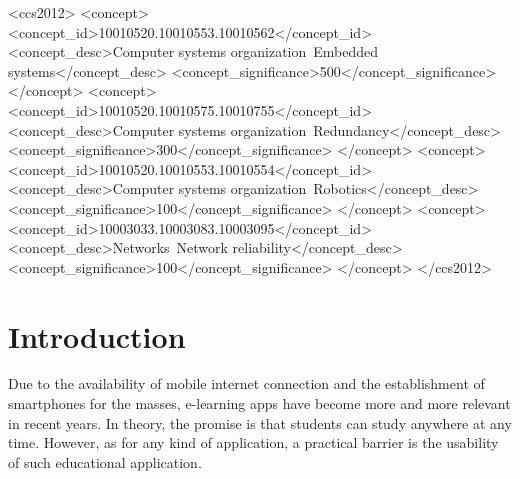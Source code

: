 \documentclass{sig-alternate-05-2015}
\begin{document}
%
%
\begin{CCSXML}
  <ccs2012>
  <concept>
  <concept_id>10010520.10010553.10010562</concept_id>
  <concept_desc>Computer systems organization~Embedded systems</concept_desc>
  <concept_significance>500</concept_significance>
  </concept>
  <concept>
  <concept_id>10010520.10010575.10010755</concept_id>
  <concept_desc>Computer systems organization~Redundancy</concept_desc>
  <concept_significance>300</concept_significance>
  </concept>
  <concept>
  <concept_id>10010520.10010553.10010554</concept_id>
  <concept_desc>Computer systems organization~Robotics</concept_desc>
  <concept_significance>100</concept_significance>
  </concept>
  <concept>
  <concept_id>10003033.10003083.10003095</concept_id>
  <concept_desc>Networks~Network reliability</concept_desc>
  <concept_significance>100</concept_significance>
  </concept>
  </ccs2012>
\end{CCSXML}
%
%
%
%
\printccsdesc
\section{Introduction}
Due to the availability of mobile internet connection and the establishment of
smartphones for the masses, e-learning apps have become more and more relevant
in recent years.  In theory, the promise is that students can study anywhere
at any time. However, as for any kind of application, a practical barrier is
the usability of such educational application.
\end{document}
